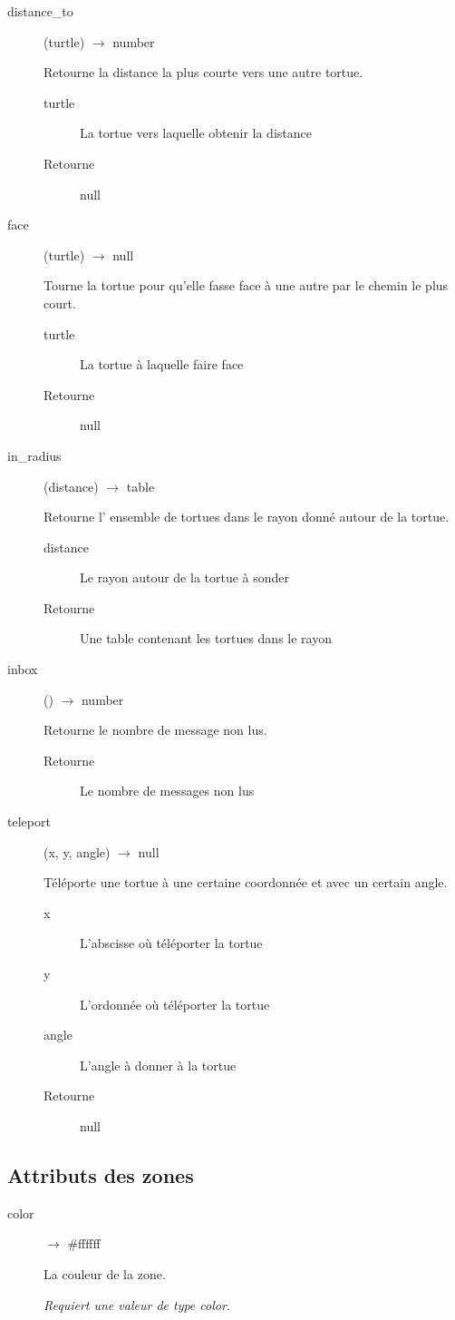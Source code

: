 \begin{description}
	\item[distance\_to] (turtle) $\rightarrow$ number

	Retourne la distance la plus courte vers une autre tortue.

	\begin{description}
		\item[turtle] La tortue vers laquelle obtenir la distance
		\item[Retourne] null
	\end{description}

	\item[face] (turtle) $\rightarrow$ null

	Tourne la tortue pour qu'elle fasse face à une autre par le chemin le plus court.

	\begin{description}
		\item[turtle] La tortue à laquelle faire face
		\item[Retourne] null
	\end{description}

	\item[in\_radius] (distance) $\rightarrow$ table

	Retourne l' ensemble de tortues dans le rayon donné autour de la tortue.

	\begin{description}
		\item[distance] Le rayon autour de la tortue à sonder
		\item[Retourne] Une table contenant les tortues dans le rayon
	\end{description}

	\item[inbox] () $\rightarrow$ number

	Retourne le nombre de message non lus.

	\begin{description}
		\item[Retourne] Le nombre de messages non lus
	\end{description}

	\item[teleport] (x, y, angle) $\rightarrow$ null

	Téléporte une tortue à une certaine coordonnée et avec un certain angle.

	\begin{description}
		\item[x] L'abscisse où téléporter la tortue
		\item[y] L'ordonnée où téléporter la tortue
		\item[angle] L'angle à donner à la tortue
		\item[Retourne] null
	\end{description}
\end{description}

\subsection{Attributs des zones}

\begin{description}
	\item[color] $\rightarrow$ \#ffffff

	La couleur de la zone.

	\emph{Requiert une valeur de type color.}
\end{description}

